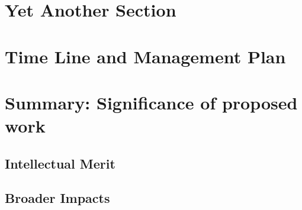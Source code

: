 \documentclass{proposalnsf}
\begin{document}
\section{Yet Another Section}

\section{Time Line and Management Plan}



\section{Summary:  Significance of proposed work}

\subsection{Intellectual Merit}

\subsection{Broader Impacts}



\newpage
{}
\renewcommand{\thepage} {E--\arabic{page}}




\newpage
{}
\renewcommand{\thepage} {G--\arabic{page}}
\end{document}
